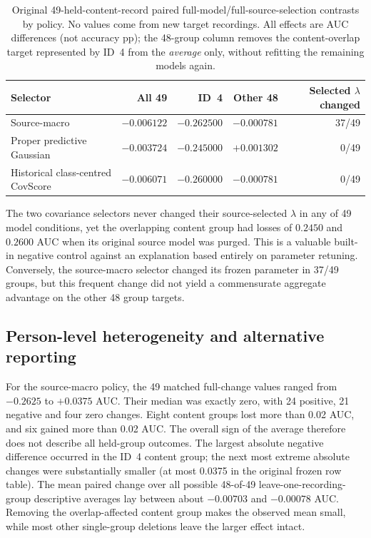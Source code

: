 \begin{table}[tb]
\centering\small
\caption{Original 49-held-content-record
paired full-model/full-source-selection contrasts
by policy. No values come from new target recordings.
All effects are AUC differences (not accuracy pp);
the 48-group column removes the content-overlap
target represented by ID~4 from the \emph{average}
only, without refitting the remaining models again.
}
\label{tab:p2-localisation-controls}
\setlength{\tabcolsep}{4.5pt}
\begin{tabular}{p{.37\linewidth}rrrr}
\toprule
Selector & All 49 & ID~4 & Other 48 &
Selected $\lambda$ changed\\
\midrule
Source-macro
& $-0.006122$ & $-0.262500$ & $-0.000781$ & 37/49\\
Proper predictive Gaussian
& $-0.003724$ & $-0.245000$ & $+0.001302$ & 0/49\\
Historical class-centred CovScore
& $-0.006071$ & $-0.260000$ & $-0.000781$ & 0/49\\
\bottomrule
\end{tabular}
\end{table}
The two covariance selectors never changed their
source-selected $\lambda$ in any of 49 model conditions,
yet the overlapping content group had losses of
$0.2450$ and $0.2600$ AUC when its original
source model was purged. This is a valuable
built-in negative control against an explanation
based entirely on parameter retuning.
Conversely, the source-macro selector changed
its frozen parameter in 37/49 groups, but
this frequent change did not yield a commensurate
aggregate advantage on the other 48 group targets.

\subsection{Person-level heterogeneity and alternative reporting}
\label{sec:p2-heterogeneity}
For the source-macro policy, the 49 matched
full-change values ranged from $-0.2625$
to $+0.0375$ AUC. Their median was exactly
zero, with 24 positive, 21 negative and four
zero changes. Eight content groups lost more
than 0.02 AUC, and six gained more than
0.02 AUC. The overall sign of the average
therefore does not describe all held-group
outcomes. The largest absolute negative
difference occurred in the ID~4 content group;
the next most extreme absolute changes
were substantially smaller (at most
0.0375 in the original frozen row table).
The mean paired change over all possible
48-of-49 leave-one-recording-group descriptive
averages lay between about $-0.00703$
and $-0.00078$ AUC. Removing the
overlap-affected content group makes the
observed mean small, while most other
single-group deletions leave the larger
effect intact.

